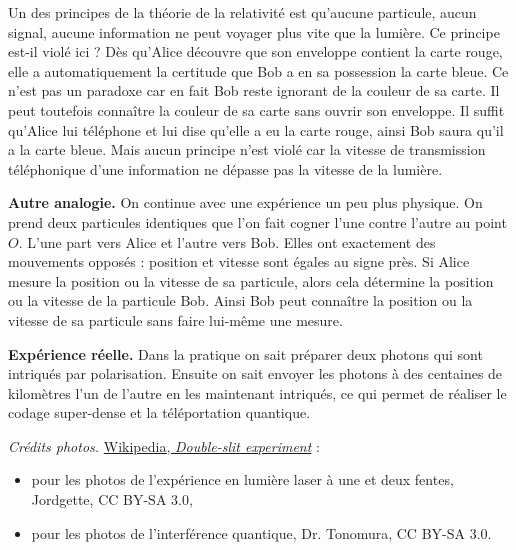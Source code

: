 \documentclass[11pt,class=report,crop=false]{standalone}
\begin{document}
 
Un des principes de la théorie de la relativité est qu'aucune particule, aucun signal, aucune information ne peut voyager plus vite que la lumière. Ce principe est-il violé ici ? Dès qu'Alice découvre que son enveloppe contient la carte rouge, elle a automatiquement la certitude que Bob a en sa possession la carte bleue. Ce n'est pas un paradoxe car en fait Bob reste ignorant de la couleur de sa carte. Il peut toutefois connaître la couleur de sa carte sans ouvrir son enveloppe. Il suffit qu'Alice lui téléphone et lui dise qu'elle a eu la carte rouge, ainsi Bob saura qu'il a la carte bleue. Mais aucun principe n'est violé car la vitesse de transmission téléphonique d'une information ne dépasse pas la vitesse de la lumière.

\bigskip 
\textbf{Autre analogie.} On continue avec une expérience un peu plus physique.
On prend deux particules identiques que l'on fait cogner l'une contre l'autre au point $O$.
L'une part vers Alice et l'autre vers Bob. Elles ont exactement des mouvements opposés : position et vitesse sont égales au signe près. Si Alice mesure la position ou la vitesse de sa particule, alors cela détermine la position ou la vitesse de la particule Bob. Ainsi Bob peut connaître la position ou la vitesse de sa particule sans faire lui-même une mesure.


\bigskip
\textbf{Expérience réelle.} Dans la pratique on sait préparer deux photons qui sont intriqués par polarisation. Ensuite on sait envoyer les photons à des centaines de kilomètres l'un de l'autre en les maintenant intriqués, ce qui permet de réaliser le codage super-dense et la téléportation quantique.

\bigskip
\bigskip

\emph{Crédits photos.} \href{https://en.wikipedia.org/wiki/Double-slit_experiment}{Wikipedia, \emph{Double-slit experiment}} :
\begin{itemize}
  \item pour les photos de l'expérience en lumière laser à une et deux fentes, Jordgette, CC BY-SA 3.0,
  \item pour les photos de l'interférence quantique, Dr. Tonomura, CC BY-SA 3.0.
\end{itemize}
\end{document}
